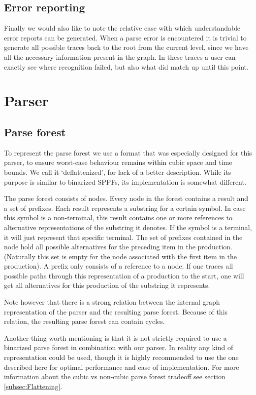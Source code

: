 \documentclass[a4paper,10pt]{article}
\begin{document}
\pagebreak
\subsection{Error reporting}

Finally we would also like to note the relative ease with which understandable error reports can be generated. When a parse error is encountered it is trivial to generate all possible traces back to the root from the current level, since we have all the necessary information present in the graph. In these traces a user can exactly see where recognition failed, but also what did match up until this point.

\section{Parser}

\subsection{Parse forest}

To represent the parse forest we use a format that was especially designed for this parser, to ensure worst-case behaviour remains within cubic space and time bounds. We call it `deflattenized', for lack of a better description. While its purpose is similar to binarized SPPFs, its implementation is somewhat different.

The parse forest consists of nodes. Every node in the forest contains a result and a set of prefixes. Each result represents a substring for a certain symbol. In case this symbol is a non-terminal, this result contains one or more references to alternative representations of the substring it denotes. If the symbol is a terminal, it will just represent that specific terminal. The set of prefixes contained in the node hold all possible alternatives for the preceding item in the production. (Naturally this set is empty for the node associated with the first item in the production). A prefix only consists of a reference to a node. If one traces all possible paths through this representation of a production to the start, one will get all alternatives for this production of the substring it represents.

Note however that there is a strong relation between the internal graph representation of the parser and the resulting parse forest. Because of this relation, the resulting parse forest can contain cycles.

Another thing worth mentioning is that it is not strictly required to use a binarized parse forest in combination with our parser. In reality any kind of representation could be used, though it is highly recommended to use the one described here for optimal performance and ease of implementation. For more information about the cubic vs non-cubic parse forest tradeoff see section \ref{subsec:Flattening}.
\end{document}
